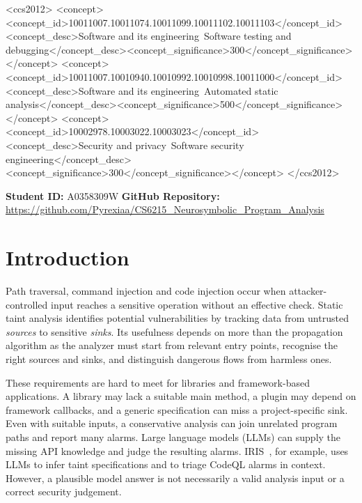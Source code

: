 \documentclass[sigconf]{acmart}
\begin{document}
\begin{CCSXML}
<ccs2012>
<concept><concept_id>10011007.10011074.10011099.10011102.10011103</concept_id>
<concept_desc>Software and its engineering~Software testing and debugging</concept_desc><concept_significance>300</concept_significance></concept>
<concept><concept_id>10011007.10010940.10010992.10010998.10011000</concept_id>
<concept_desc>Software and its engineering~Automated static analysis</concept_desc><concept_significance>500</concept_significance></concept>
<concept><concept_id>10002978.10003022.10003023</concept_id>
<concept_desc>Security and privacy~Software security engineering</concept_desc><concept_significance>300</concept_significance></concept>
</ccs2012>
\end{CCSXML}

\maketitle
{}
\noindent\textbf{Student ID:} A0358309W \quad \textbf{GitHub Repository:} \url{https://github.com/Pyrexiaa/CS6215_Neurosymbolic_Program_Analysis}


\section{Introduction}
Path traversal, command injection and code injection occur when attacker-controlled input reaches a sensitive operation without an effective check. Static taint analysis identifies potential vulnerabilities by tracking data from untrusted \emph{sources} to sensitive \emph{sinks}. Its usefulness depends on more than the propagation algorithm as the analyzer must start from relevant entry points, recognise the right sources and sinks, and distinguish dangerous flows from harmless ones.

These requirements are hard to meet for libraries and framework-based applications. A library may lack a suitable main method, a plugin may depend on framework callbacks, and a generic specification can miss a project-specific sink. Even with suitable inputs, a conservative analysis can join unrelated program paths and report many alarms. Large language models (LLMs) can supply the missing API knowledge and judge the resulting alarms. IRIS~\cite{li2025iris}, for example, uses LLMs to infer taint specifications and to triage CodeQL alarms in context. However, a plausible model answer is not necessarily a valid analysis input or a correct security judgement.
\end{document}
